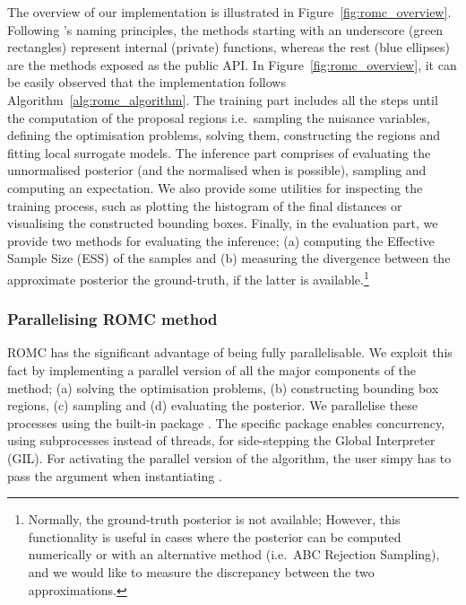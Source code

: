 

The overview of our implementation is illustrated in
Figure~\ref{fig:romc_overview}. Following 's naming
principles, the methods starting with an underscore (green rectangles)
represent internal (private) functions, whereas the rest (blue
ellipses) are the methods exposed as the public API. In
Figure~\ref{fig:romc_overview}, it can be easily observed that the
implementation follows Algorithm~\ref{alg:romc_algorithm}. The
training part includes all the steps until the computation of the
proposal regions i.e.~sampling the nuisance variables, defining the
optimisation problems, solving them, constructing the regions and
fitting local surrogate models. The inference part comprises of
evaluating the unnormalised posterior (and the normalised when is
possible), sampling and computing an expectation. We also provide some
utilities for inspecting the training process, such as plotting the
histogram of the final distances or visualising the constructed
bounding boxes. Finally, in the evaluation part, we provide two
methods for evaluating the inference; (a) computing the Effective
Sample Size (ESS) of the samples and (b) measuring the divergence
between the approximate posterior the ground-truth, if the latter is
available.\footnote{Normally, the ground-truth posterior is not
  available; However, this functionality is useful in cases where the
  posterior can be computed numerically or with an alternative method
  (i.e.\ ABC Rejection Sampling), and we would like to measure the
  discrepancy between the two approximations.}

\subsubsection*{Parallelising ROMC method}

ROMC has the significant advantage of being fully parallelisable. We
exploit this fact by implementing a parallel version of all the major
components of the method; (a) solving the optimisation problems, (b)
constructing bounding box regions, (c) sampling and (d) evaluating the
posterior. We parallelise these processes using the built-in
 package . The specific package
enables concurrency, using subprocesses instead of threads, for
side-stepping the Global Interpreter (GIL). For activating the
parallel version of the algorithm, the user simpy has to pass the
argument  when instantiating .

